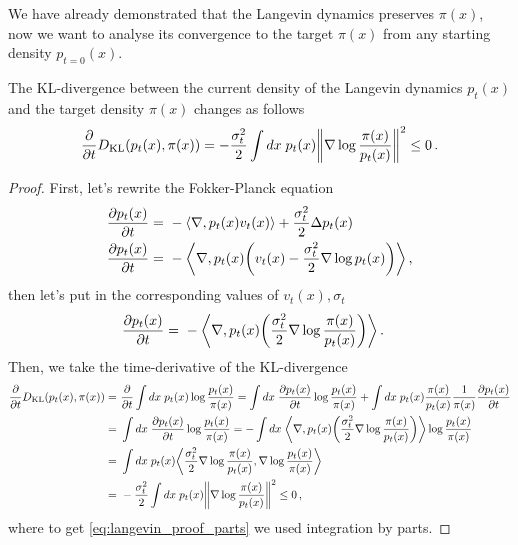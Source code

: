 We have already demonstrated that the Langevin dynamics preserves $\pi(x)$, now we want to analyse its convergence to the target $\pi(x)$ from any starting density $p_{t=0}(x)$.
\begin{theorem}
    The KL-divergence between the current density of the Langevin dynamics $p_t(x)$ and the target density $\pi(x)$ changes as follows
    \begin{align}
        \deriv{}{t}\KL(p_t(x),\pi(x)) = -\frac{\sigma_t^2}{2}\int dx\; p_t(x)\norm{\nabla\log \frac{\pi(x)}{p_t(x)}}^2 \leq 0\,.
    \end{align}
\end{theorem}
\begin{proof}
    First, let's rewrite the Fokker-Planck equation
    \begin{align}
        \deriv{p_t(x)}{t} =~& -\inner{\nabla}{p_t(x)v_t(x)} + \frac{\sigma_t^2}{2}\Delta p_t(x)\\
        \deriv{p_t(x)}{t} =~& -\inner{\nabla}{p_t(x)\left(v_t(x) - \frac{\sigma_t^2}{2} \nabla\log p_t(x)\right)}\,,
    \end{align}
    then let's put in the corresponding values of $v_t(x),\sigma_t$
    \begin{align}
        \deriv{p_t(x)}{t} =~& -\inner{\nabla}{p_t(x)\left(\frac{\sigma_t^2}{2} \nabla\log \frac{\pi(x)}{p_t(x)}\right)}\,.
    \end{align}
    Then, we take the time-derivative of the KL-divergence
    \begin{align}
        \deriv{}{t}\KL(p_t(x),\pi(x)) =~& \deriv{}{t}\int dx\; p_t(x)\log\frac{p_t(x)}{\pi(x)} = \int dx\; \deriv{p_t(x)}{t}\log\frac{p_t(x)}{\pi(x)} + \int dx\; p_t(x)\frac{\pi(x)}{p_t(x)}\frac{1}{\pi(x)}\deriv{p_t(x)}{t} \nonumber\\
        =~& \int dx\; \deriv{p_t(x)}{t}\log\frac{p_t(x)}{\pi(x)} = -\int dx\; \inner{\nabla}{p_t(x)\left(\frac{\sigma_t^2}{2} \nabla\log \frac{\pi(x)}{p_t(x)}\right)}\log\frac{p_t(x)}{\pi(x)}\\
        =~& \int dx\; p_t(x)\inner{\frac{\sigma_t^2}{2} \nabla\log \frac{\pi(x)}{p_t(x)}}{\nabla\log\frac{p_t(x)}{\pi(x)}} \label{eq:langevin_proof_parts}\\
        =~& -\frac{\sigma_t^2}{2}\int dx\; p_t(x)\norm{\nabla\log \frac{\pi(x)}{p_t(x)}}^2 \leq 0\,,
    \end{align}
    where to get \cref{eq:langevin_proof_parts} we used integration by parts.
\end{proof}

